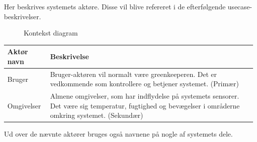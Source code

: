 Her beskrives systemets aktøre. Disse vil blive refereret i de efterfølgende usecase-beskrivelser.

\begin{figure}[htbp] \centering
{}
\caption{Kontekst diagram}
\label{lab:kontekstdiagram}
\end{figure}

%

\begin{table}[!htbp] \centering
	\begin{tabular}{|p{2.5cm}|p{11.5cm}|}
	\hline
		\textbf{Aktør navn} & \textbf{Beskrivelse} \\\hline
		Bruger & Bruger-aktøren vil normalt være greenkeeperen. Det er vedkommende som kontrollere og betjener systemet. (Primær) \\\hline

		Omgivelser & Almene omgivelser, som har indflydelse på systemets sensorer. Det være sig temperatur, fugtighed og bevægelser i områderne omkring systemet. (Sekundær) \\\hline
	\end{tabular}
\end{table}

Ud over de nævnte aktører bruges også navnene på nogle af systemets dele.
